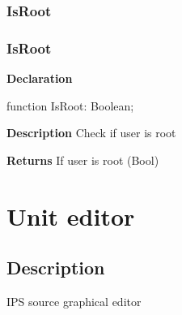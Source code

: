 \documentclass{report}
\newif\ifpdf
\begin{document}
\subsection*{\large{\textbf{IsRoot}}\normalsize\hspace{1ex}\hrulefill}
\else
\subsection*{IsRoot}
\fi
\label{distri-IsRoot}
\begin{list}{}{
\setlength{\itemindent}{0cm}
\setlength{\listparindent}{0cm}
\setlength{\leftmargin}{\evensidemargin}
\addtolength{\leftmargin}{\tmplength}
\settowidth{\labelsep}{X}
\addtolength{\leftmargin}{\labelsep}
\setlength{\labelwidth}{\tmplength}
}
\item[\textbf{Declaration}\hfill]
\ifpdf
\begin{flushleft}
\fi
\begin{ttfamily}
function IsRoot: Boolean;\end{ttfamily}

\ifpdf
\end{flushleft}
\fi

\par
\item[\textbf{Description}]
Check if user is root \par
\item[\textbf{Returns}]If user is root (Bool)


\end{list}
\chapter{Unit editor}
\label{editor}
\section{Description}
IPS source graphical editor
\end{document}
